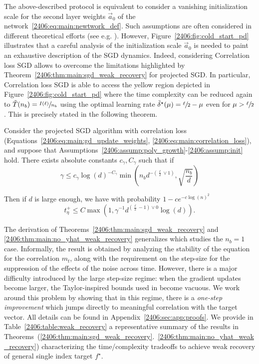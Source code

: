 The above-described protocol is equivalent to consider a vanishing initialization scale for the second layer weights $\vec a_0$ of the network~\ref{2406:eq:main:newtwork_def}. Such assumptions are often considered in different theoretical efforts (see e.g. \cite{abbe2022merged,berthier2023learning,abbe2023sgd}). However, Figure~\ref{2406:fig:cold_start_pd} illustrates that a careful analysis of the initialization scale $\vec a_0$ is needed to paint an exhaustive description of the SGD dynamics. Indeed, considering Correlation loss SGD allows to overcome the limitations highlighted by Theorem~\ref{2406:thm:main:sgd_weak_recovery} for projected SGD. In particular, Correlation loss SGD is able to access the yellow region depicted in Figure~\ref{2406:fig:cold_start_pd} where the time complexity can be reduced again to $\Tilde{T}(n_b) = \sfrac{I(\ell)}{n_b}$ using the optimal learning rate $\Tilde{\delta}^\star(\mu) = \sfrac{\ell}{2} - \mu$ even for $\mu > \sfrac{\ell}{2}$. This is precisely stated in the following theorem. 
\begin{theorem} 
\label{2406:thm:main:no_yhat_weak_recovery}
   Consider the projected SGD algorithm with correlation loss (Equations~\eqref{2406:eq:main:gd_update_weights}, \eqref{2406:eq:main:correlation_loss}), and suppose that Assumptions~\ref{2406:assump:poly_growth}-\ref{2406:assump:init} hold. There exists absolute constants $c_\gamma, C_\gamma$ such that if
   \[ \gamma \leq c_\gamma \log(d)^{-C_\gamma} \min\left( n_b d^{-\left(\frac\ell2\vee 1\right)}, \sqrt{\frac{n_b}d} \right) \]
    
   Then if $d$ is large enough, we have with probability $1-ce^{-c\log(n)^2}$
   \begin{equation}
      t_\eta^+ \leq C \max\left(1, \gamma^{-1}d^{\left(\frac{\ell}2 - 1 \right) \vee 0}\log(d)\right).
   \end{equation}
\end{theorem}
 The derivation of Theorems~\ref{2406:thm:main:sgd_weak_recovery} and \ref{2406:thm:main:no_yhat_weak_recovery} generalizes \cite{arous2021online} which studies the $n_b =1$ case. Informally, the result is obtained by analyzing the stability of the equation for the correlation \(m_t\), along with the requirement on the step-size for the suppression of the effects of the noise across time. However, there is a major difficulty introduced by the large step-size regime: when the gradient updates become larger, the Taylor-inspired bounds used in \cite{arous2021online} become vacuous. We work around this problem by showing that in this regime, there is a \emph{one-step improvement} which jumps directly to meaningful correlation with the target vector. All details can be found in Appendix~\ref{2406:sec:app:proofs}. We provide in Table~\ref{2406:table:weak_recovery} a representative summary of the results in Theorems~(\ref{2406:thm:main:sgd_weak_recovery}.~\ref{2406:thm:main:no_yhat_weak_recovery}) characterizing the time/complexity tradeoffs to achieve weak recovery of general single index target $f^\star$.
